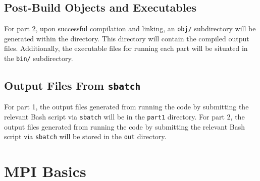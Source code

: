 \documentclass{article}
\begin{document}
\subsection{Post-Build Objects and Executables}
For part 2, upon successful compilation and linking, an \texttt{obj/} subdirectory will be generated within the directory. 
This directory will contain the compiled output files. Additionally, the executable files for running each part will be 
situated in the \texttt{bin/} subdirectory.

\subsection{Output Files From \texttt{sbatch}}
For part 1, the output files generated from running the code by submitting the relevant Bash script via \texttt{sbatch} will be 
in the \texttt{part1} directory. 
For part 2, the output files generated from running the code by submitting the relevant Bash script via \texttt{sbatch} will be 
stored in the \texttt{out} directory. 
\newpage
\section{MPI Basics}
\end{document}
